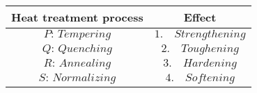\begin{tabular}[12pt]{ |c| c|}
    \hline
	\textbf{Heat treatment process}  & \textbf{Effect} \\
    \hline
	$P\colon\, Tempering$ &  $1.\quad Strengthening$  \\
    \hline 
	$Q\colon\,Quenching$ &  $2.\quad Toughening$ \\
    \hline
	$R\colon\, Annealing$ &  $3.\quad Hardening$  \\  
    \hline
    	$S\colon\, Normalizing$ &  $4.\quad Softening$  \\
    \hline         
\end{tabular}
